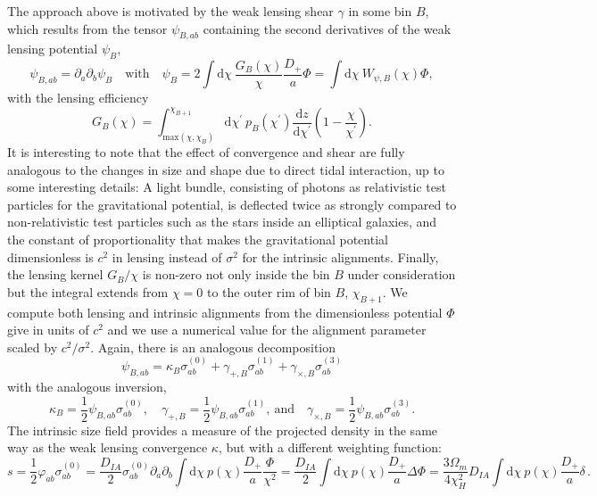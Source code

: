 \documentclass[a4paper,fleqn,usenatbib]{mnras}
\newcommand{\dd}{\mathrm{d}}
\begin{document}
The approach above is motivated by the weak lensing shear $\gamma$ in some bin $B$, which results from the tensor $\psi_{B,ab}$ containing the second derivatives of the weak lensing potential $\psi_B$,
\begin{equation}
\psi_{B,ab} = \partial_a\partial_b\psi_B
\quad\mathrm{with}\quad
\psi_B = 2\int\dd\chi\:\frac{G_B(\chi)}{\chi}\frac{D_+}{a}\Phi = \int\dd\chi\:W_{\psi,B}(\chi)\Phi,
\end{equation}
with the lensing efficiency
\begin{equation}
G_B(\chi) = \int_{\mathrm{max}(\chi,\chi_B)}^{\chi_{B+1}}\dd\chi^\prime\:p_B(\chi^\prime)\frac{\dd z}{\dd\chi^\prime}\left(1-\frac{\chi}{\chi^\prime}\right).
\end{equation}
It is interesting to note that the effect of convergence and shear are fully analogous to the changes in size and shape due to direct tidal interaction, up to some interesting details: A light bundle, consisting of photons as relativistic test particles for the gravitational potential, is deflected twice as strongly compared to non-relativistic test particles such as the stars inside an elliptical galaxies, and the constant of proportionality that makes the gravitational potential dimensionless is $c^2$ in lensing instead of $\sigma^2$ for the intrinsic alignments. Finally, the lensing kernel $G_B/\chi$ is  non-zero not only inside the bin $B$ under consideration but the integral extends from $\chi=0$ to the outer rim of bin $B$, $\chi_{B+1}$. We  compute both lensing and intrinsic alignments from the dimensionless potential $\Phi$ give in units of $c^2$ and we use a numerical value for the alignment parameter scaled by $c^2/\sigma^2$. Again, there is an analogous decomposition
\begin{equation}
\psi_{B,ab} = \kappa_B\sigma^{(0)}_{ab} + \gamma_{+,B}\sigma^{(1)}_{ab} +\gamma_{\times,B}\sigma^{(3)}_{ab}
\end{equation}
with the analogous inversion,
\begin{equation}
\kappa_B = \frac{1}{2}\psi_{B,ab}\sigma^{(0)}_{ab},
\quad
\gamma_{+,B} = \frac{1}{2}\psi_{B,ab}\sigma^{(1)}_{ab},
\mathrm{~and}\quad
\gamma_{\times,B} = \frac{1}{2}\psi_{B,ab}\sigma^{(3)}_{ab}.
\end{equation}
The intrinsic size field provides a measure of the projected density in the same way as the weak lensing convergence $\kappa$, but with a different weighting function:
\begin{equation}
s = 
\frac{1}{2}\varphi_{ab}\sigma^{(0)}_{ab} = 
\frac{D_{IA}}{2}\sigma^{(0)}_{ab}\partial_a\partial_b\int\dd\chi\: p(\chi)\frac{D_+}{a}\frac{\Phi}{\chi^2} = 
\frac{D_{IA}}{2}\int\dd\chi\:p(\chi)\frac{D_+}{a}\Delta\Phi = 
\frac{3\Omega_m}{4\chi_H^2}D_{IA}\int\dd\chi\:p(\chi)\frac{D_+}{a}\delta\,.
\end{equation}
\end{document}
